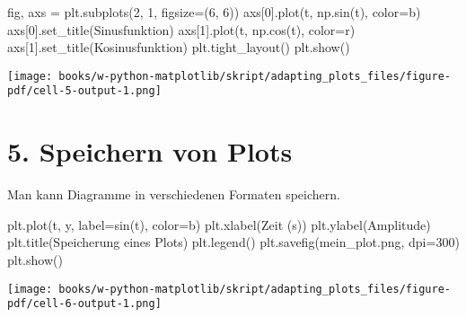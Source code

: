 \documentclass[
  letterpaper,
  DIV=11,
  numbers=noendperiod]{scrreprt}
\newenvironment{Shaded}{\begin{snugshade}}{\end{snugshade}}
\newcommand{\DecValTok}[1]{\textcolor[rgb]{0.68,0.00,0.00}{#1}}
\newcommand{\NormalTok}[1]{\textcolor[rgb]{0.00,0.23,0.31}{#1}}
\newcommand{\OperatorTok}[1]{\textcolor[rgb]{0.37,0.37,0.37}{#1}}
\newcommand{\StringTok}[1]{\textcolor[rgb]{0.13,0.47,0.30}{#1}}
\begin{document}
\begin{tcolorbox}
\begin{Shaded}
\begin{Highlighting}[]
\NormalTok{fig, axs }\OperatorTok{=}\NormalTok{ plt.subplots(}\DecValTok{2}\NormalTok{, }\DecValTok{1}\NormalTok{, figsize}\OperatorTok{=}\NormalTok{(}\DecValTok{6}\NormalTok{, }\DecValTok{6}\NormalTok{))}
\NormalTok{axs[}\DecValTok{0}\NormalTok{].plot(t, np.sin(t), color}\OperatorTok{=}\StringTok{\textquotesingle{}b\textquotesingle{}}\NormalTok{)}
\NormalTok{axs[}\DecValTok{0}\NormalTok{].set\_title(}\StringTok{\textquotesingle{}Sinusfunktion\textquotesingle{}}\NormalTok{)}
\NormalTok{axs[}\DecValTok{1}\NormalTok{].plot(t, np.cos(t), color}\OperatorTok{=}\StringTok{\textquotesingle{}r\textquotesingle{}}\NormalTok{)}
\NormalTok{axs[}\DecValTok{1}\NormalTok{].set\_title(}\StringTok{\textquotesingle{}Kosinusfunktion\textquotesingle{}}\NormalTok{)}
\NormalTok{plt.tight\_layout()}
\NormalTok{plt.show()}
\end{Highlighting}
\end{Shaded}

\texttt{[image: books/w-python-matplotlib/skript/adapting\_plots\_files/figure-pdf/cell-5-output-1.png]}

\section{5. Speichern von Plots}\label{speichern-von-plots}

Man kann Diagramme in verschiedenen Formaten speichern.

\begin{Shaded}
\begin{Highlighting}[]
\NormalTok{plt.plot(t, y, label}\OperatorTok{=}\StringTok{\textquotesingle{}sin(t)\textquotesingle{}}\NormalTok{, color}\OperatorTok{=}\StringTok{\textquotesingle{}b\textquotesingle{}}\NormalTok{)}
\NormalTok{plt.xlabel(}\StringTok{\textquotesingle{}Zeit (s)\textquotesingle{}}\NormalTok{)}
\NormalTok{plt.ylabel(}\StringTok{\textquotesingle{}Amplitude\textquotesingle{}}\NormalTok{)}
\NormalTok{plt.title(}\StringTok{\textquotesingle{}Speicherung eines Plots\textquotesingle{}}\NormalTok{)}
\NormalTok{plt.legend()}
\NormalTok{plt.savefig(}\StringTok{\textquotesingle{}mein\_plot.png\textquotesingle{}}\NormalTok{, dpi}\OperatorTok{=}\DecValTok{300}\NormalTok{)}
\NormalTok{plt.show()}
\end{Highlighting}
\end{Shaded}

\texttt{[image: books/w-python-matplotlib/skript/adapting\_plots\_files/figure-pdf/cell-6-output-1.png]}


\end{tcolorbox}
\end{document}
